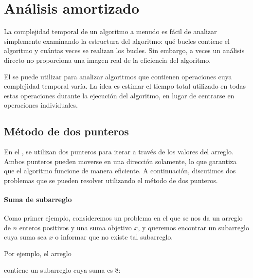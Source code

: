 \chapter{Análisis amortizado}


La complejidad temporal de un algoritmo
a menudo es fácil de analizar
simplemente examinando la estructura
del algoritmo:
qué bucles contiene el algoritmo
y cuántas veces se realizan los bucles.
Sin embargo, a veces un análisis directo
no proporciona una imagen real de la eficiencia del algoritmo.

El  se puede utilizar para analizar
algoritmos que contienen operaciones cuya
complejidad temporal varía.
La idea es estimar el tiempo total utilizado en
todas estas operaciones durante la
ejecución del algoritmo, en lugar de centrarse
en operaciones individuales.

\section{Método de dos punteros}


En el ,
se utilizan dos punteros para
iterar a través de los valores del arreglo.
Ambos punteros pueden moverse en una dirección solamente,
lo que garantiza que el algoritmo funcione de manera eficiente.
A continuación, discutimos dos problemas que se pueden resolver
utilizando el método de dos punteros.

\subsubsection{Suma de subarreglo}

Como primer ejemplo,
consideremos un problema en el que se nos da
un arreglo de $n$ enteros positivos
y una suma objetivo $x$,
y queremos encontrar un subarreglo cuya suma sea $x$
o informar que no existe tal subarreglo.

Por ejemplo, el arreglo
\begin{center}
\end{center}
contiene un subarreglo cuya suma es 8:
\begin{center}
\end{center}

